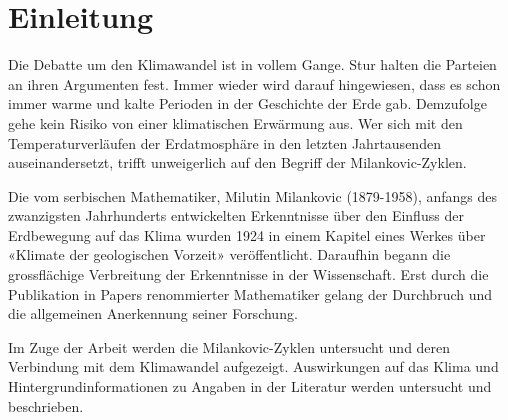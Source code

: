 %
%
%
%
\section{Einleitung\label{milankovic:section:Einleitung}}

Die Debatte um den Klimawandel ist in vollem Gange.
Stur halten die Parteien an ihren Argumenten fest.
Immer wieder wird darauf hingewiesen, dass es schon immer warme und kalte Perioden in der Geschichte der Erde gab.
Demzufolge gehe kein Risiko von einer klimatischen Erwärmung aus.
Wer sich mit den Temperaturverläufen der Erdatmosphäre in den letzten Jahrtausenden auseinandersetzt, trifft unweigerlich auf den Begriff der Milankovic-Zyklen.

Die vom serbischen Mathematiker, Milutin Milankovic (1879-1958), anfangs des zwanzigsten Jahrhunderts entwickelten Erkenntnisse über den Einfluss der Erdbewegung auf das Klima wurden 1924 in einem Kapitel eines Werkes über «Klimate der geologischen Vorzeit» veröffentlicht.
Daraufhin begann die grossflächige Verbreitung der Erkenntnisse in der Wissenschaft.
Erst durch die Publikation in Papers renommierter Mathematiker gelang der Durchbruch und die allgemeinen Anerkennung seiner Forschung.

Im Zuge der Arbeit werden die Milankovic-Zyklen untersucht und deren Verbindung mit dem Klimawandel aufgezeigt. Auswirkungen auf das Klima und Hintergrundinformationen zu Angaben in der Literatur werden untersucht und beschrieben.

